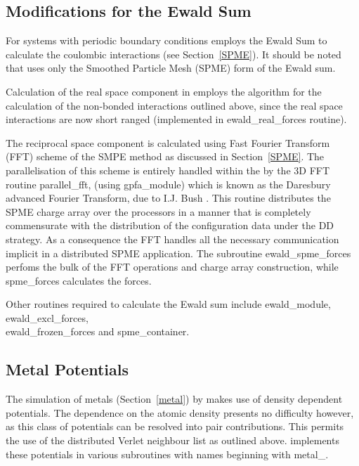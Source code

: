 \subsection{Modifications for the Ewald Sum}

For systems with periodic boundary conditions \D employs the Ewald
Sum to calculate the coulombic interactions
(see Section~\ref{SPME}).  It should be noted that \D uses only the
Smoothed Particle Mesh (SPME) form of the Ewald sum.

Calculation of the real space component in \D employs the
algorithm for the calculation of the non-bonded interactions
outlined above, since the real space interactions are now short
ranged (implemented in {\sc ewald\_real\_forces} routine).

The reciprocal space component is calculated using Fast Fourier
Transform (FFT) scheme of the SMPE method \cite{essmann-95a,bush-06a} as
discussed in Section~\ref{SPME}.  The parallelisation of this scheme is
entirely handled within the \D by the 3D FFT routine {\sc parallel\_fft},
(using {\sc gpfa\_module}) which is known as the Daresbury advanced
Fourier Transform, due to I.J. Bush \cite{bush-00a}.  This routine
distributes the SPME charge array over the processors in a manner
that is completely commensurate with the distribution of the
configuration data under the DD strategy.  As a consequence the
FFT handles all the necessary communication implicit in a
distributed SPME application.  The \D subroutine {\sc ewald\_spme\_forces}
perfoms the bulk of the FFT operations and charge array construction,
while {\sc spme\_forces} calculates the forces.

Other routines required to calculate the Ewald sum include {\sc ewald\_module}, \\
{\sc ewald\_excl\_forces}, \\ {\sc ewald\_frozen\_forces} and {\sc spme\_container}.

\subsection{Metal Potentials}

The simulation of metals (Section~\ref{metal}) by \D makes use of density
dependent potentials.  The dependence on the atomic density presents
no difficulty however, as this class of potentials can be resolved
into pair contributions.  This permits the use of the distributed
Verlet neighbour list as
outlined above.  \D implements these potentials in various
subroutines with names beginning with {\sc metal\_}.

